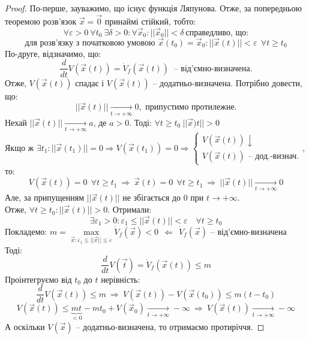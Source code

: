 \documentclass[14pt,a4paper]{scrartcl}
\theoremstyle{definition}
\theoremstyle{definition}
\theoremstyle{definition}
\begin{document}
\begin{proof}
  По-перше, зауважимо, що існує функція Ляпунова. Отже, за попередньою теоремою розв'язок $\overrightarrow{x}  = \overrightarrow{0} $ принаймі стійкий, тобто:
  $$
  \forall \varepsilon  >0 \ \forall t_0 \ \exists \delta > 0 : \forall \overrightarrow{x}_0 : ||\overrightarrow{x}_0|| < \delta \ \text{справедливо, що:}
  $$
  $$
  \text{для розв'язку з початковою умовою } \overrightarrow{x}(t_0) = \overrightarrow{x}_0 : ||\overrightarrow{x}(t)|| < \varepsilon \ \  \forall t \geq t_0
  $$
  По-друге, відзначимо, що:
  $$
  \frac{d}{dt} V (\overrightarrow{x}(t)) = \dot{V}_f ( \overrightarrow{x}(t)) \ \text{ -- від'ємно-визначена.}
  $$
  Отже, $V( \overrightarrow{x} (t))$ спадає і $V(\overrightarrow{x}(t))$ -- додатньо-визначена. Потрібно довести, що: $$||\overrightarrow{x} (t)|| \xrightarrow[t \to +\infty]{} 0, \text{ припустимо протилежне.}$$
  Нехай $|| \overrightarrow{x}(t)|| \xrightarrow[t \to + \infty]{} a $, де $a > 0$. Тоді: $\forall t \geq t_0 \ ||\overrightarrow{x})t||>0 $ \\ Якщо ж $\exists t_1: ||\overrightarrow{x}(t_1)|| = 0 \Rightarrow V(\overrightarrow{x}(t_1)) = 0 \Rightarrow \begin{cases}
   V(\overrightarrow{x}(t)) \! \downarrow \\
   V(\overrightarrow{x}(t)) \text{ -- дод.-визнач.}
  \end{cases}$, то:
$$
V(\overrightarrow{x}(t))  = 0 \ \ \forall t \geq t_1\ \Rightarrow\ \overrightarrow{x}(t) = 0 \ \ \forall t \geq t_1\ \Rightarrow\ ||\overrightarrow{x}(t)|| \xrightarrow[ t \to +\infty]{} 0
$$
Але, за припущенням $||\overrightarrow{x}(t)||$ не збігається до 0 при $t \to + \infty$.\\
Отже, $\forall t \geq t_0: ||\overrightarrow{x}(t)|| > 0$. Отримали:
$$
\exists \varepsilon _1 > 0 : \varepsilon_1 \leq ||\overrightarrow{x} (t)|| < \varepsilon  \quad \forall t \geq t_0
$$
Покладемо: $ m = \max\limits_{\overrightarrow{x}: \varepsilon_1 \leq  ||\overrightarrow{x}|| \leq \varepsilon } \dot{V}_f ( \overrightarrow{x} ) < 0 \ \  \Longleftarrow \ \ \dot{V}_f (\overrightarrow{x}) \text{ -- від'ємно-визначена }$
Тоді:
$$
\frac{d}{dt} V(\overrightarrow{t}) = \dot{V}_f (\overrightarrow{x}(t))  \leq m
$$
Проінтегруємо від $t_0$ до $t$ нерівність:
$$
\frac{d}{dt} V(\overrightarrow{x} (t)) \leq m \ \Longrightarrow \  V(\overrightarrow{x} (t)) - V(\overrightarrow{x} (t_0)) \leq  m (t-t_0)
$$
$$
V(\overrightarrow{x}(t)) \leq \underbrace{mt}_{<0} - mt_0 + V(\overrightarrow{x}_0) \xrightarrow[t \to + \infty]{} -\infty \ \Longrightarrow \ V(\overrightarrow{x} (t)) \xrightarrow[t\to+\infty]{}  -\infty
$$
А оскільки $V(\overrightarrow{x})$ -- додатньо-визначена, то отримаємо протиріччя.
\end{proof}
\end{document}
